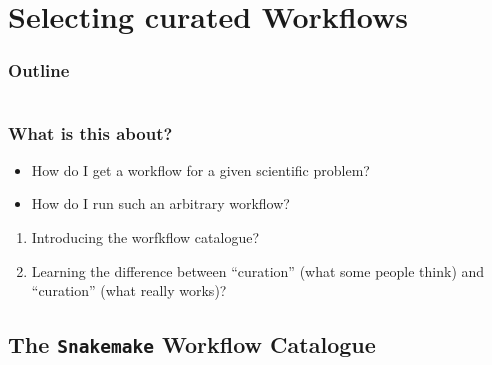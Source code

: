 \section{Selecting curated Workflows}

\begin{frame}
    \frametitle{Outline}
    \begin{columns}[t]
        \begin{column}{.5\textwidth}
            \tableofcontents[sections={1-9},currentsection]
        \end{column}
        \begin{column}{.5\textwidth}
            \tableofcontents[sections={10-18},currentsection]
        \end{column}
    \end{columns}
\end{frame}

\begin{frame}
  \frametitle{What is this about?}
   \begin{question}[Questions]
   	 \begin{itemize}
       \item How do I get a workflow for a given scientific problem?
       \item How do I run such an arbitrary workflow?
     \end{itemize}
   \end{question} 
   \begin{docs}[Objectives]
   	  \begin{enumerate}
                      \item Introducing the worfkflow catalogue?
                      \item Learning the difference between ``curation'' (what some people think) and ``curation'' (what really works)?
      \end{enumerate}
    \end{docs}
\end{frame}  

\subsection{The \texttt{Snakemake} Workflow Catalogue}

